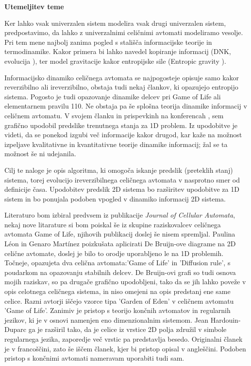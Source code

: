 \documentclass[a4paper, 12pt]{article}
\begin{document}
{\bf Utemeljitev teme}

Ker lahko vsak univerzalen sistem modelira vsak drugi univerzalen sistem, predpostavimo,
da lahko z univerzalnimi celičnimi avtomati modeliramo vesolje. Pri tem mene najbolj zanima pogled s
stališča informacijske teorije in termodinamike. Kakor primera bi lahko navedel kopiranje informacij
(DNK, evolucija \cite{Salzberg2004}), ter model gravitacije kakor entropijske sile (Entropic gravity \cite{Verlinde2010}).

Informacijsko dinamiko celičnega avtomata se najpogosteje opisuje samo kakor reverzibilno ali ireverzibilno,
obstaja tudi nekaj člankov, ki opazujejo entropijo sistema.
Pogosto je tudi opazovanje dinamike delcev pri Game of Life ali elementarnem pravilu 110.
Ne obstaja pa še splošna teorija dinamike informacij v celičnem avtomatu.
V svojem članku \cite{JerasDobnikar2007} in prispevkinh na konferencah \cite{DBLP:conf/iccS/JerasD06, DBLP:conf/automata/Jeras08},
sem grafično upodobil predslike trenutnega stanja za 1D problem.
Iz upodobitve je videti, da se ponekod izgubi več informacije kakor drugod,
kar kaže na možnost izpeljave kvalitativne in kvantitativne teorije dinamike informacij;
žal se ta možnost še ni udejanila.

Cilj te naloge je opis algoritma, ki omogoča iskanje predslik (preteklih stanj) sistema, torej evolucijo
ireverzibilnega celičnega avtomata v nasprotno smer od definicije časa.
Upodobitev predslik 2D sistema bo razširitev upodobitve za 1D sistem
in bo ponujala podoben vpogled v dinamiko informacij 2D sistema.

\bigskip

Literaturo bom izbiral predvsem iz publikacije {\it Journal of Cellular Automata},
nekaj nove litarature si bom poiskal še iz skupine raziskovalcev celičnega avtomata
Game of Life, njihovih publikacij doslej še nisem spremljal.
Paulina Léon in Genaro Martínez \cite{PaulinaGenaro2016} poizkušata aplicirati
De Bruijn-ove diagrame na 2D celične avtomate, doslej je bilo to orodje uporabljeno le na 1D problemih.
Točneje, opazujeta dva celična avtomata:'Game of Life' in 'Diffusion rule',
s poudarkom na opazovanju stabilnih delcev. De Bruijn-ovi grafi so tudi osnova mojih raziskav,
so pa drugače grafično upodobljeni, tako da se jih lahko poveže v opis celotnega celičnega sistema,
in niso omejeni na opis predstanj ene same celice.
Razni avtorji \cite{Hartman2013} iščejo vzorce tipa 'Garden of Eden' v celičnem avtomatu 'Game of Life'.
Zanimiv je pristop s teorijo končnih avtomatov in regularnih jezikov, ki je v
osnovi namenjen eno dimenzionalnim sistemom. Jean Hardouin-Duparc ga je razširil
tako, da je celice iz vrstice 2D polja združil v simbole regularnega jezika, zaporedje več
vrstic pa predstavlja besedo. Originalni članek je v francoščini, zato še iščem članek,
kjer bi pristop opisal v angleščini. Podoben pristop s končnimi avtomati nameravam uporabiti tudi sam.
\end{document}

